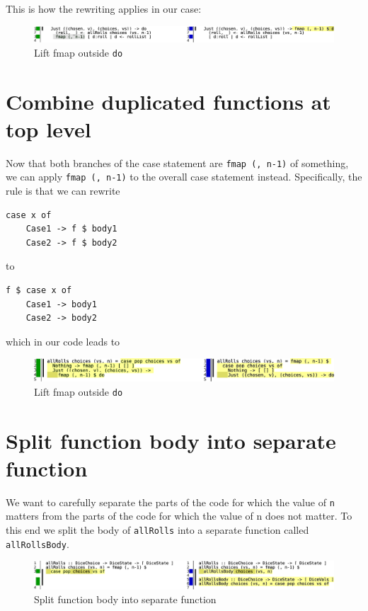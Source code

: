 This is how the rewriting applies in our case:

\begin{figure}[htbp]
 \centering
 \includegraphics[width=\linewidth]{./pics/diff19.pdf}
 \caption{Lift fmap outside \texttt{do}}
 \label{fig:diff19}
\end{figure}
 
\section{Combine duplicated functions at top level}


Now that both branches of the case statement are \texttt{fmap (, n-1)} of something, we can apply \texttt{fmap (, n-1)} to the overall case statement instead. Specifically, the rule is that we can rewrite

\begin{verbatim}
case x of
    Case1 -> f $ body1
    Case2 -> f $ body2
\end{verbatim}
to

\begin{verbatim}
f $ case x of
    Case1 -> body1
    Case2 -> body2
\end{verbatim}
which in our code leads to

\begin{figure}[htbp]
 \centering
 \includegraphics[width=\linewidth]{./pics/diff20.pdf}
 \caption{Lift fmap outside \texttt{do}}
 \label{fig:diff20}
\end{figure}


\section{Split function body into separate function}


We want to carefully separate the parts of the code for which the value of \texttt{n} matters from the parts of the code for which the value of n does not matter. To this end we split the body of \texttt{allRolls} into a separate function called \texttt{allRollsBody}.

\begin{figure}[htbp]
 \centering
 \includegraphics[width=\linewidth]{./pics/diff21.pdf}
 \caption{Split function body into separate function}
 \label{fig:diff21}
\end{figure}


